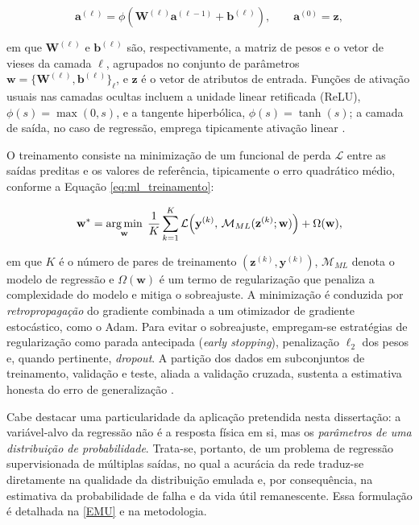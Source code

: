 \begin{equation}\label{eq:mlp_forward}
\mathbf{a}^{(\ell)} = \phi\!\left(\mathbf{W}^{(\ell)} \mathbf{a}^{(\ell-1)} + \mathbf{b}^{(\ell)}\right), \qquad \mathbf{a}^{(0)} = \mathbf{z},
\end{equation}

em que $\mathbf{W}^{(\ell)}$ e $\mathbf{b}^{(\ell)}$ são, respectivamente, a matriz de pesos e o vetor de vieses da camada $\ell$, agrupados no conjunto de parâmetros $\mathbf{w} = \{\mathbf{W}^{(\ell)}, \mathbf{b}^{(\ell)}\}_\ell$, e $\mathbf{z}$ é o vetor de atributos de entrada. Funções de ativação usuais nas camadas ocultas incluem a unidade linear retificada (ReLU), $\phi(s) = \max(0,s)$, e a tangente hiperbólica, $\phi(s) = \tanh(s)$; a camada de saída, no caso de regressão, emprega tipicamente ativação linear \cite{bishop2006, goodfellow2016}.

O treinamento consiste na minimização de um funcional de perda $\mathcal{L}$ entre as saídas preditas e os valores de referência, tipicamente o erro quadrático médio, conforme a Equação \eqref{eq:ml_treinamento}:

\begin{equation}\label{eq:ml_treinamento}
\mathbf{w}^{*} = \operatorname*{arg\,min}_{\mathbf{w}} \; \frac{1}{K}\sum_{k=1}^{K} \mathcal{L}\!\left(\mathbf{y}^{(k)},\, \mathcal{M}_{ML}(\mathbf{z}^{(k)};\mathbf{w})\right) + \Omega(\mathbf{w}),
\end{equation}

em que $K$ é o número de pares de treinamento $(\mathbf{z}^{(k)}, \mathbf{y}^{(k)})$, $\mathcal{M}_{ML}$ denota o modelo de regressão e $\Omega(\mathbf{w})$ é um termo de regularização que penaliza a complexidade do modelo e mitiga o sobreajuste. A minimização é conduzida por \textit{retropropagação} do gradiente combinada a um otimizador de gradiente estocástico, como o Adam. Para evitar o sobreajuste, empregam-se estratégias de regularização como parada antecipada (\textit{early stopping}), penalização $\ell_2$ dos pesos e, quando pertinente, \textit{dropout}. A partição dos dados em subconjuntos de treinamento, validação e teste, aliada a validação cruzada, sustenta a estimativa honesta do erro de generalização \cite{hastie2009}.

Cabe destacar uma particularidade da aplicação pretendida nesta dissertação: a variável-alvo da regressão não é a resposta física em si, mas os \textit{parâmetros de uma distribuição de probabilidade}. Trata-se, portanto, de um problema de regressão supervisionada de múltiplas saídas, no qual a acurácia da rede traduz-se diretamente na qualidade da distribuição emulada e, por consequência, na estimativa da probabilidade de falha e da vida útil remanescente. Essa formulação é detalhada na \autoref{EMU} e na metodologia.


